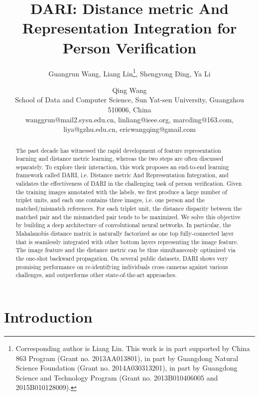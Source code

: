 \documentclass[letterpaper]{article}
\begin{document}
\title{DARI: Distance metric And Representation Integration for Person Verification}
\author{Guangrun Wang, Liang Lin\thanks{Corresponding author is Liang Lin. This work is in part supported by China 863 Program (Grant no. 2013AA013801), in part by Guangdong Natural Science Foundation (Grant no. 2014A030313201), in part by Guangdong Science and Technology Program (Grant no. 2013B010406005 and 2015B010128009).}, Shengyong Ding, Ya Li \and Qing Wang\\
School of Data and Computer Science, Sun Yat-sen University, Guangzhou 510006, China\\
 wanggrun@mail2.sysu.edu.cn, linliang@ieee.org, marcding@163.com,\\ liya@gzhu.edu.cn, ericwangqing@gmail.com
}
\maketitle

\begin{abstract}
The past decade has witnessed the rapid development of feature representation learning and distance metric learning, whereas the two steps are often discussed separately. To explore their interaction, this work proposes an end-to-end learning framework called DARI, i.e. Distance metric And Representation Integration, and validates the effectiveness of DARI in the challenging task of person verification. Given the training images annotated with the labels, we first produce a large number of triplet units, and each one contains three images, i.e. one person and the matched/mismatch references. For each triplet unit, the distance disparity between the matched pair and the mismatched pair tends to be maximized. We solve this objective by building a deep architecture of convolutional neural networks. In particular, the Mahalanobis distance matrix is naturally factorized as one top fully-connected layer that is seamlessly integrated with other bottom layers representing the image feature. The image feature and the distance metric can be thus simultaneously optimized via the one-shot backward propagation. On several public datasets, DARI shows very promising performance on re-identifying individuals cross cameras against various challenges, and outperforms other state-of-the-art approaches.
\end{abstract}

\section{Introduction}
\end{document}
